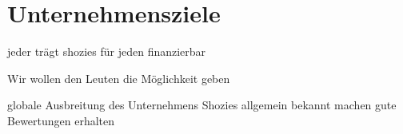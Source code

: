 \chapter{Unternehmensziele}
\label{cha:2}
jeder trägt shozies
für jeden finanzierbar

Wir wollen den Leuten die Möglichkeit geben 



globale Ausbreitung des Unternehmens
Shozies allgemein bekannt machen
gute Bewertungen erhalten